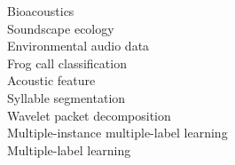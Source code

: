 %



\begin{keywords}
Bioacoustics \\
Soundscape ecology\\
Environmental audio data \\
Frog call classification \\
Acoustic feature \\
Syllable segmentation\\
Wavelet packet decomposition \\
Multiple-instance multiple-label learning \\
Multiple-label learning \\
 
\end{keywords}






